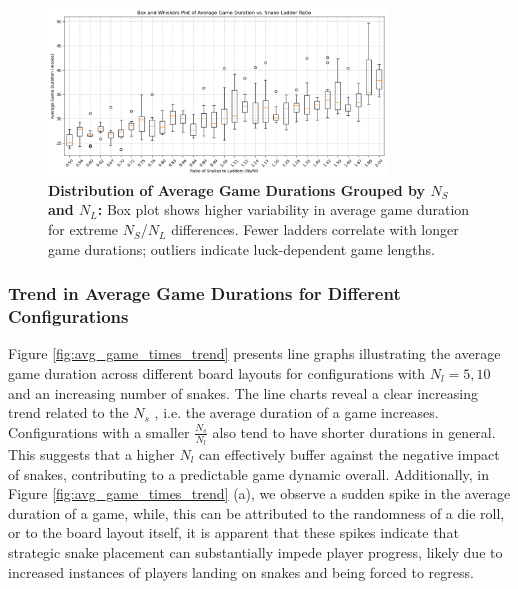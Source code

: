 \begin{figure}[th]
	\centering
	\includegraphics[width=0.8\textwidth]{"../Chapter 1/BoxPlots"}
	\caption{\textbf{Distribution of Average Game Durations Grouped by $N_S$ and $N_L$:} Box plot shows higher variability in average game duration for extreme $N_S$/$N_L$ differences. Fewer ladders correlate with longer game durations; outliers indicate luck-dependent game lengths.}
	\label{fig:boxplots}
\end{figure}

\subsubsection{Trend in Average Game Durations for Different Configurations}
	
Figure \ref{fig:avg_game_times_trend} presents line graphs illustrating the average game duration across different board layouts for configurations with $N_l=5,10$ and an increasing number of snakes. The line charts reveal a clear increasing trend related to the $N_s$ , i.e. the average duration of a game increases. Configurations with a smaller $\frac{N_s}{N_l}$ also tend to have shorter durations in general. This suggests that a higher $N_l$ can effectively buffer against the negative impact of snakes, contributing to a predictable game dynamic overall. Additionally, in Figure \ref{fig:avg_game_times_trend} (a), we observe a sudden spike in the average duration of a game, while, this can be attributed to the randomness of a die roll, or to the board layout itself, it is apparent that these spikes indicate that strategic snake placement can substantially impede player progress, likely due to increased instances of players landing on snakes and being forced to regress.
	
